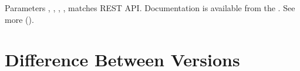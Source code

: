\documentclass[a4paper,10pt,english]{sphinxmanual}
\begin{document}
\sphinxAtStartPar
Parameters , , , ,  matches REST API. Documentation is available from the .
See more {\hyperref[\detokenize{api:sub-chapter-rest-api}]{}} ().

\sphinxstepscope


\chapter{Difference Between Versions}
\label{\detokenize{versions:difference-between-versions}}\label{\detokenize{versions:chapter-versions}}\label{\detokenize{versions::doc}}
\end{document}
